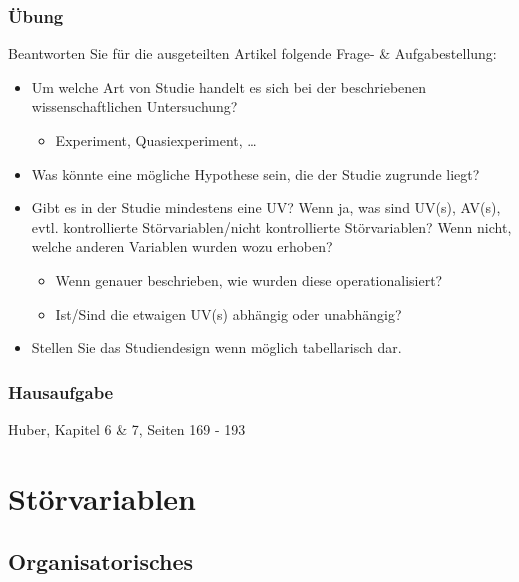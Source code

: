 \documentclass[
]{book}
\providecommand{\tightlist}{%
  \setlength{\itemsep}{0pt}\setlength{\parskip}{0pt}}
\begin{document}
\hypertarget{uxfcbung-1}{%
\subsection{Übung}\label{uxfcbung-1}}

Beantworten Sie für die ausgeteilten Artikel folgende Frage- \& Aufgabestellung:

\begin{itemize}
\tightlist
\item
  Um welche Art von Studie handelt es sich bei der beschriebenen wissenschaftlichen Untersuchung?

  \begin{itemize}
  \tightlist
  \item
    Experiment, Quasiexperiment, \ldots{}
  \end{itemize}
\item
  Was könnte eine mögliche Hypothese sein, die der Studie zugrunde liegt?
\item
  Gibt es in der Studie mindestens eine UV? Wenn ja, was sind UV(s), AV(s), evtl. kontrollierte Störvariablen/nicht kontrollierte Störvariablen? Wenn nicht, welche anderen Variablen wurden wozu erhoben?

  \begin{itemize}
  \tightlist
  \item
    Wenn genauer beschrieben, wie wurden diese operationalisiert?
  \item
    Ist/Sind die etwaigen UV(s) abhängig oder unabhängig?
  \end{itemize}
\item
  Stellen Sie das Studiendesign wenn möglich tabellarisch dar.
\end{itemize}

\hypertarget{hausaufgabe-1}{%
\subsection{Hausaufgabe}\label{hausaufgabe-1}}

Huber, Kapitel 6 \& 7, Seiten 169 - 193

\hypertarget{stuxf6rvariablen}{%
\chapter{Störvariablen}\label{stuxf6rvariablen}}

\hypertarget{organisatorisches-6}{%
\section{Organisatorisches}\label{organisatorisches-6}}
\end{document}
